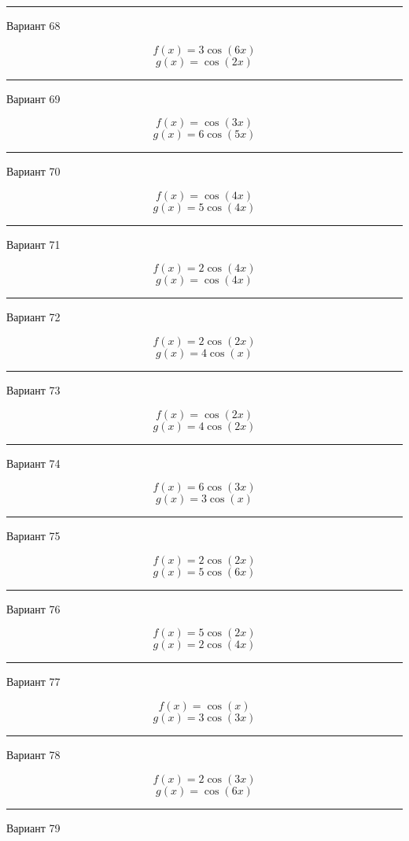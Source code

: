 \documentclass[11pt]{report}
\begin{document}
\rule{\textwidth}{.2mm}

Вариант 68

$$f(x)=3 \cos{\left(6 x \right)}$$
$$g(x)=\cos{\left(2 x \right)}$$

\rule{\textwidth}{.2mm}

Вариант 69

$$f(x)=\cos{\left(3 x \right)}$$
$$g(x)=6 \cos{\left(5 x \right)}$$

\rule{\textwidth}{.2mm}

Вариант 70

$$f(x)=\cos{\left(4 x \right)}$$
$$g(x)=5 \cos{\left(4 x \right)}$$

\rule{\textwidth}{.2mm}

Вариант 71

$$f(x)=2 \cos{\left(4 x \right)}$$
$$g(x)=\cos{\left(4 x \right)}$$

\rule{\textwidth}{.2mm}

Вариант 72

$$f(x)=2 \cos{\left(2 x \right)}$$
$$g(x)=4 \cos{\left(x \right)}$$

\rule{\textwidth}{.2mm}

Вариант 73

$$f(x)=\cos{\left(2 x \right)}$$
$$g(x)=4 \cos{\left(2 x \right)}$$

\rule{\textwidth}{.2mm}

Вариант 74

$$f(x)=6 \cos{\left(3 x \right)}$$
$$g(x)=3 \cos{\left(x \right)}$$

\rule{\textwidth}{.2mm}

Вариант 75

$$f(x)=2 \cos{\left(2 x \right)}$$
$$g(x)=5 \cos{\left(6 x \right)}$$

\rule{\textwidth}{.2mm}

Вариант 76

$$f(x)=5 \cos{\left(2 x \right)}$$
$$g(x)=2 \cos{\left(4 x \right)}$$

\rule{\textwidth}{.2mm}

Вариант 77

$$f(x)=\cos{\left(x \right)}$$
$$g(x)=3 \cos{\left(3 x \right)}$$

\rule{\textwidth}{.2mm}

Вариант 78

$$f(x)=2 \cos{\left(3 x \right)}$$
$$g(x)=\cos{\left(6 x \right)}$$

\rule{\textwidth}{.2mm}

Вариант 79
\end{document}
